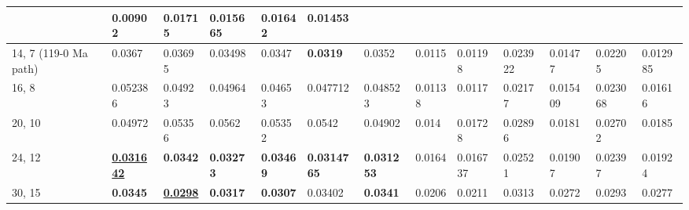 \begin{table*}
{\begin{tabular}{|l|l|l|l|l|l|l|l|l|l|l|l|l|}
  & 0.00902 & 0.01715 & 0.015665 & {\color[HTML]{32CB00} \textbf{0.01642}} &
  0.01453 \\ \hline
14, 7 (119-0 Ma path) & 0.0367 & 0.03695 & 0.03498 & 0.0347 &
  {\color[HTML]{34FF34} \textbf{0.0319}} & 0.0352 & 0.0115 & 0.01198 & 0.023922
  & 0.01477 & 0.02205 & 0.012985 \\ \hline
16, 8 & 0.052386 & 0.04923 & 0.04964 & 0.04653 & 0.047712 & 0.048523 & 0.01138
  & 0.0117 & 0.02177 & 0.015409 & 0.023068 &
  0.01616 \\ \hline
20, 10 & 0.04972 & 0.05356 & 0.0562 & 0.05352 & 0.0542 & 0.04902 & 0.014 &
  0.01728 & 0.02896 & 0.0181 & 0.02702 & 0.0185 \\ \hline
24, 12 & {\color[HTML]{009901} {\ul \textbf{0.031642}}} & {\color[HTML]{34FF34}
  \textbf{0.0342}} & {\color[HTML]{34FF34} \textbf{0.03273}} &
  {\color[HTML]{34FF34} \textbf{0.03469}} & {\color[HTML]{32CB00} \textbf{0.0314765}} & {\color[HTML]{32CB00} \textbf{0.031253}} & 0.0164 &
  0.016737 & 0.02521 & 0.01907 & 0.02397 & 0.01924 \\ \hline
30, 15 & {\color[HTML]{34FF34} \textbf{0.0345}} & {\color[HTML]{009901} {\ul
  \textbf{0.0298}}} & {\color[HTML]{32CB00} \textbf{0.0317}} &
  {\color[HTML]{32CB00} \textbf{0.0307}} & 0.03402 & {\color[HTML]{34FF34}
  \textbf{0.0341}} & 0.0206 & 0.0211 & 0.0313 & 0.0272 & 0.0293 & 0.0277 \\ \hline
\end{tabular}%
}
\end{table*}
